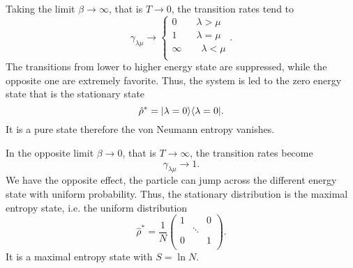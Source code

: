 Taking the limit $\beta \rightarrow \infty$, that is $T  \rightarrow 0$, the transition rates tend to
\begin{equation}
    \gamma_{\lambda\mu} \rightarrow \left\{\begin{aligned}
        0 \qquad \lambda > \mu\\
        1 \qquad \lambda = \mu\\
        \infty \qquad  \lambda < \mu \\
    \end{aligned}\right. . 
\end{equation}
The transitions from lower to higher energy state are suppressed, while the opposite one are extremely favorite. Thus, the system is led to the zero energy state that is the stationary state
\begin{equation}\label{beta_inf_stationary_distribution}
    \hat\rho^* = \lvert\lambda = 0\rangle\langle\lambda = 0\rvert.
\end{equation} 
It is a pure state therefore the von Neumann entropy vanishes.

In the opposite limit $\beta \rightarrow 0$, that is $T \rightarrow \infty$, the transition rates become
\begin{equation}
    \gamma_{\lambda\mu} \rightarrow 1.
\end{equation}
We have the opposite effect, the particle can jump across the different energy state with uniform probability. Thus, the stationary distribution is the maximal entropy state, i.e. the uniform distribution
\begin{equation}
    \hat\rho^* = \frac{1}{N}\begin{pmatrix}
        1&&0\\
        &\ddots&\\
        0&&1\\
    \end{pmatrix}.
\end{equation}
It is a maximal entropy state with $S = \ln N$.

